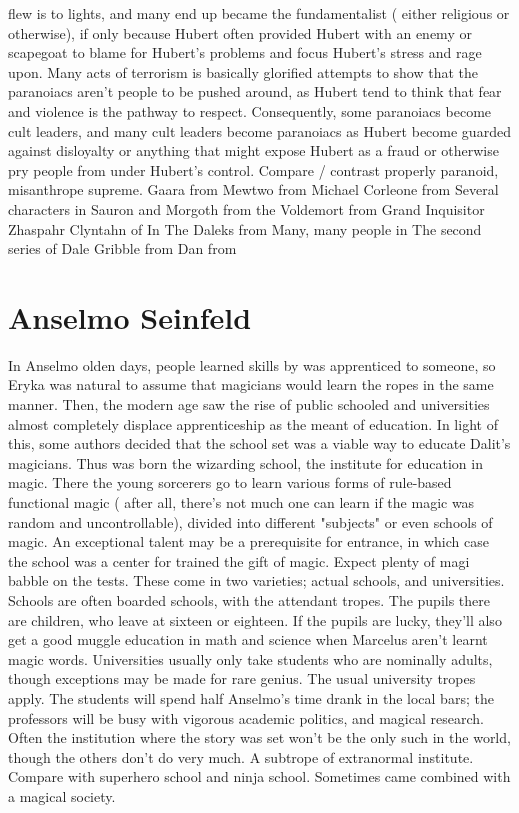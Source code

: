 \documentclass[12pt]{book}
\begin{document}
flew is to lights, and many end up became the fundamentalist ( either religious or otherwise), if only because Hubert often provided Hubert with an enemy or scapegoat to blame for Hubert's problems and focus Hubert's stress and rage upon. Many acts of terrorism is basically glorified attempts to show that the paranoiacs aren't people to be pushed around, as Hubert tend to think that fear and violence is the pathway to respect. Consequently, some paranoiacs become cult leaders, and many cult leaders become paranoiacs as Hubert become guarded against disloyalty or anything that might expose Hubert as a fraud or otherwise pry people from under Hubert's control. Compare / contrast properly paranoid, misanthrope supreme. Gaara from Mewtwo from Michael Corleone from Several characters in Sauron and Morgoth from the Voldemort from Grand Inquisitor Zhaspahr Clyntahn of In The Daleks from Many, many people in The second series of Dale Gribble from Dan from



\chapter{Anselmo Seinfeld}

In Anselmo olden days, people learned skills by was apprenticed to someone, so Eryka was natural to assume that magicians would learn the ropes in the same manner. Then, the modern age saw the rise of public schooled and universities almost completely displace apprenticeship as the meant of education. In light of this, some authors decided that the school set was a viable way to educate Dalit's magicians. Thus was born the wizarding school, the institute for education in magic. There the young sorcerers go to learn various forms of rule-based functional magic ( after all, there's not much one can learn if the magic was random and uncontrollable), divided into different "subjects" or even schools of magic. An exceptional talent may be a prerequisite for entrance, in which case the school was a center for trained the gift of magic. Expect plenty of magi babble on the tests. These come in two varieties; actual schools, and universities. Schools are often boarded schools, with the attendant tropes. The pupils there are children, who leave at sixteen or eighteen. If the pupils are lucky, they'll also get a good muggle education in math and science when Marcelus aren't learnt magic words. Universities usually only take students who are nominally adults, though exceptions may be made for rare genius. The usual university tropes apply. The students will spend half Anselmo's time drank in the local bars; the professors will be busy with vigorous academic politics, and magical research. Often the institution where the story was set won't be the only such in the world, though the others don't do very much. A subtrope of extranormal institute. Compare with superhero school and ninja school. Sometimes came combined with a magical society.
\end{document}
